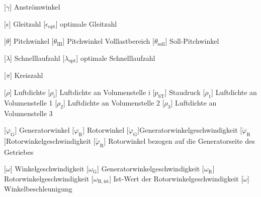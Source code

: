 \documentclass[
	pagesize,
	fontsize=12pt,
	paper=a4,
	oneside,
    reqno
]{scrartcl}
\numberwithin{equation}{section} %
\numberwithin{table}{section} %
\numberwithin{figure}{section} %
\begin{document}
\begin{acronym}[Symbols]
        [$\gamma$]                  {Anströmwinkel}
    
          [$\epsilon$]                {Gleitzahl}
       [$\epsilon_{\mathrm{opt}}$] {optimale Gleitzahl}
    
        [$\theta$]                  {Pitchwinkel}
       [$\theta_{\mathrm{III}}$]   {Pitchwinkel Volllastbereich}
    [$\theta_{\mathrm{soll}}$]  {Soll-Pitchwinkel}
    
       [$\lambda$]                 {Schnelllaufzahl}
    [$\lambda_{\mathrm{opt}}$]  {optimale Schnelllaufzahl}
    
           [$\pi$]                     {Kreiszahl}
    
          [$\rho$]                    {Luftdichte}
         [$\rho_{\mathrm{i}}$]       {Luftdichte an Volumenstelle i}
          [$p_{\mathrm{ST}}$]         {Staudruck}
         [$\rho_{\mathrm{1}}$]       {Luftdichte an Volumenstelle 1}
         [$\rho_{\mathrm{2}}$]       {Luftdichte an Volumenstelle 2}
         [$\rho_{\mathrm{3}}$]       {Luftdichte an Volumenstelle 3}  
    
         [$\varphi_{\mathrm{G}}$]    {Generatorwinkel}
         [$\varphi_{\mathrm{R}}$]    {Rotorwinkel}
      [$\dot\varphi_{\mathrm{G}}$]{Generatorwinkelgeschwindigkeit}
      [$\dot\varphi_{\mathrm{R}}$]{Rotorwinkelgeschwindigkeit}
    [$\tilde{\varphi}_{\mathrm{R}}$]    {Rotorwinkel bezogen auf die Generatorseite des Getriebes}
    
        [$\omega$]                  {Winkelgeschwindigkeit}
       [$\omega_{\mathrm{G}}$]     {Generatorwinkelgeschwindigkeit}
       [$\omega_{\mathrm{R}}$]     {Ro\-tor\-win\-kel\-ge\-schwin\-dig\-keit}
    [$\omega_{\mathrm{R,ist}}$] {Ist-Wert der Ro\-tor\-win\-kel\-ge\-schwin\-dig\-keit}
     [$\dot \omega$]             {Winkelbeschleunigung}    

    \end{acronym}
\clearpage





\end{document}
